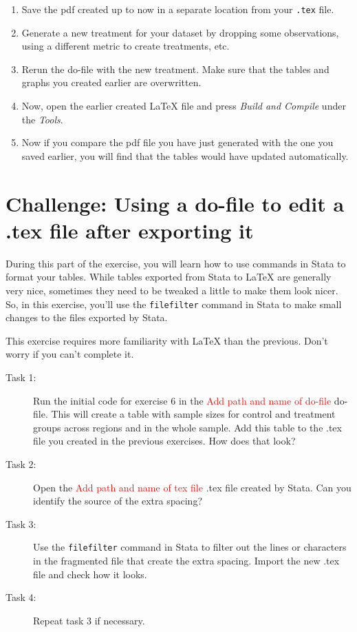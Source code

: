 \documentclass[12pts]{report}
\begin{document}
\begin{enumerate}
	\item Save the pdf created up to now in a separate location from your \texttt{.tex} file. 
	\item Generate a new treatment for your dataset by dropping some observations, using a different metric to create treatments, etc. 
	\item Rerun the do-file with the new treatment. Make sure that the tables and graphs you created earlier are overwritten. 
	\item Now, open the earlier created {\LaTeX} file and press \textit{Build and Compile} under the \textit{Tools}.
	\item Now if you compare the pdf file you have just generated with the one you saved earlier, you will find that the tables would have updated automatically. 
\end{enumerate}

\section*{Challenge: Using a do-file to edit a .tex file after exporting it}
During this part of the exercise, you will learn how to use commands in Stata to format your tables. While tables exported from Stata to {\LaTeX} are generally very nice, sometimes they need to be tweaked a little to make them look nicer. So, in this exercise, you'll use the \texttt{filefilter} command in Stata to make small changes to the files exported by Stata. 

This exercise requires more familiarity with {\LaTeX} than the previous. Don't worry if you can't complete it. 

\begin{description}
	\item[Task 1:] Run the initial code for exercise 6 in the \textcolor{red}{Add path and name of do-file} do-file. This will create a table with sample sizes for control and treatment groups across regions and in the whole sample. Add this table to the .tex file you created in the previous exercises. How does that look?
	\item[Task 2:] Open the \textcolor{red}{Add path and name of tex file} .tex file created by Stata. Can you identify the source of the extra spacing?
	\item[Task 3:] Use the \texttt{filefilter} command in Stata to filter out the lines or characters in the fragmented file that create the extra spacing. Import the new .tex file and check how it looks.
	\item[Task 4:] Repeat task 3 if necessary.
\end{description}


\newpage
\end{document}
